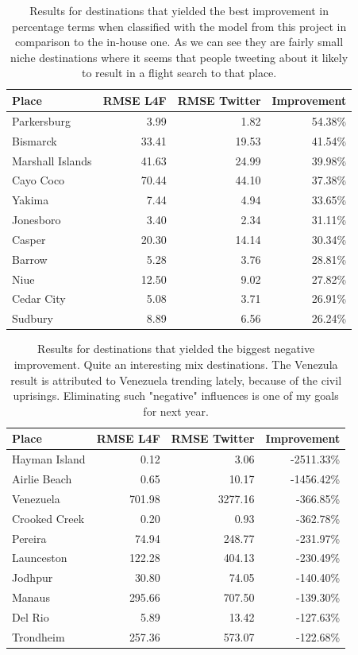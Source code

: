 \documentclass[minf,frontabs,twoside,singlespacing,parskip]{infthesis}
\begin{document}
\begin{table}[]
\begin{center}
\begin{tabular}{ l | r | r | r}
Place & RMSE L4F & RMSE Twitter & Improvement \\
\hline
Parkersburg & 3.99 & 1.82 & 54.38\% \\
Bismarck & 33.41 & 19.53 & 41.54\% \\
Marshall Islands & 41.63 & 24.99 & 39.98\% \\
Cayo Coco & 70.44 & 44.10 & 37.38\% \\
Yakima & 7.44 & 4.94 & 33.65\% \\
Jonesboro & 3.40 & 2.34 & 31.11\% \\
Casper & 20.30 & 14.14 & 30.34\% \\
Barrow & 5.28 & 3.76 & 28.81\% \\
Niue & 12.50 & 9.02 & 27.82\% \\
Cedar City & 5.08 & 3.71 & 26.91\% \\
Sudbury & 8.89 & 6.56 & 26.24\% \\
\end{tabular}
\end{center}
\caption{Results for destinations that yielded the best improvement in percentage terms when classified with the model from this project in comparison to the in-house one. As we can see they are fairly small niche destinations where it seems that people tweeting about it likely to result in a flight search to that place.}
\label{4-1}
\end{table}

\begin{table}[]
\begin{center}
\begin{tabular}{ l | r | r | r}
Place & RMSE L4F & RMSE Twitter & Improvement \\
\hline
Hayman Island & 0.12 & 3.06 & -2511.33\% \\
Airlie Beach & 0.65 & 10.17 & -1456.42\% \\
Venezuela & 701.98 & 3277.16 & -366.85\% \\
Crooked Creek & 0.20 & 0.93 & -362.78\% \\
Pereira & 74.94 & 248.77 & -231.97\% \\
Launceston & 122.28 & 404.13 & -230.49\% \\
Jodhpur & 30.80 & 74.05 & -140.40\% \\
Manaus & 295.66 & 707.50 & -139.30\% \\
Del Rio & 5.89 & 13.42 & -127.63\% \\
Trondheim & 257.36 & 573.07 & -122.68\%
\end{tabular}
\end{center}
\caption{Results for destinations that yielded the biggest negative improvement. Quite an interesting mix destinations. The Venezula result is attributed to Venezuela trending lately, because of the civil uprisings. Eliminating such "negative" influences is one of my goals for next year.}
\label{4-2}
\end{table}
\end{document}
